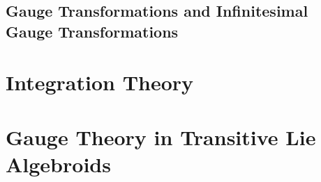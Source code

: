 \documentclass[12pt]{report}
\theoremstyle{definition}
\begin{document}
\section{Gauge Transformations and Infinitesimal Gauge Transformations}

\chapter{Integration Theory}\label{chp:KMS}



\chapter{Gauge Theory in Transitive Lie Algebroids}\label{chp:KMS}



\printbibliography
\end{document}
